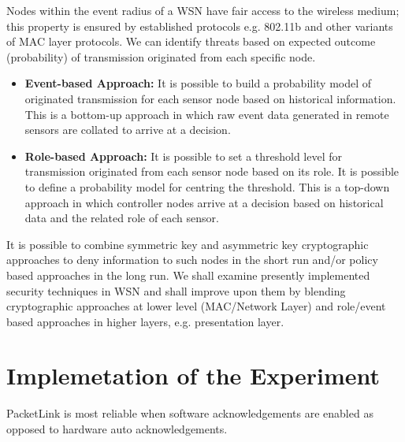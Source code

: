 \documentclass[conference,man]{IEEEtran}
\begin{document}
 

Nodes within the event radius of a WSN have fair access to the wireless medium; this property is ensured by established protocols e.g. 802.11b and other variants of MAC layer protocols. We can identify threats based on expected outcome (probability) of transmission originated from each specific node. \\ %
\begin{itemize}
\item \textbf{Event-based Approach:} It is possible to build a probability model of originated transmission for each sensor node based on historical information. This is a bottom-up approach in which raw event data generated in remote sensors are collated to arrive at a decision.%

\item \textbf{Role-based Approach:} It is possible to set a threshold level for transmission originated from each sensor node based on its role. It is possible to define a probability model for centring the threshold. This is a top-down approach in which controller nodes arrive at a decision based on historical data and the related role of each sensor. %

\end{itemize}

It is possible to combine symmetric key and asymmetric key cryptographic approaches to deny information to such nodes in the short run and/or policy based approaches in the long run. We shall examine presently implemented security techniques in WSN and shall improve upon them by blending cryptographic approaches at lower level (MAC/Network Layer) and role/event based approaches in higher layers, e.g. presentation layer.



\section{Implemetation of the Experiment}  %
\label{sec:imp}
PacketLink is most reliable when software acknowledgements are enabled 
  as opposed to hardware auto acknowledgements.
  
\end{document}

